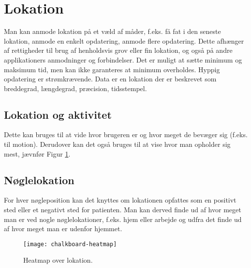 \section{Lokation}
Man kan anmode lokation på et væld af måder, f.eks. få fat i den seneste lokation, anmode en enkelt opdatering, anmode flere opdatering. 
Dette afhænger af rettigheder til brug af henholdsvis grov eller fin lokation, og også på andre applikationers anmodninger og forbindelser. Det er muligt at sætte minimum og maksimum tid, men kan ikke garanteres at minimum overholdes. Hyppig opdatering er strømkrævende. 
Data er en lokation der er beskrevet som breddegrad, længdegrad, præcision, tidsstempel.

\subsection{Lokation og aktivitet}
Dette kan bruges til at vide hvor brugeren er og hvor meget de bevæger sig (f.eks. til motion).
Derudover kan det også bruges til at vise hvor man opholder sig mest, jævnfør Figur \ref{heatmap}.
\subsection{Nøglelokation}
For hver nøgleposition kan det knyttes om lokationen opfattes som en positivt sted eller et negativt sted for patienten.
Man kan derved finde ud af hvor meget man er ved nogle nøglelokationer, f.eks. hjem eller arbejde og udfra det finde ud af hvor meget man er udenfor hjemmet. 

\begin{figure}[h]
	\centering
	\texttt{[image: chalkboard-heatmap]}
	\caption{Heatmap over lokation.}\label{heatmap}
\end{figure}
